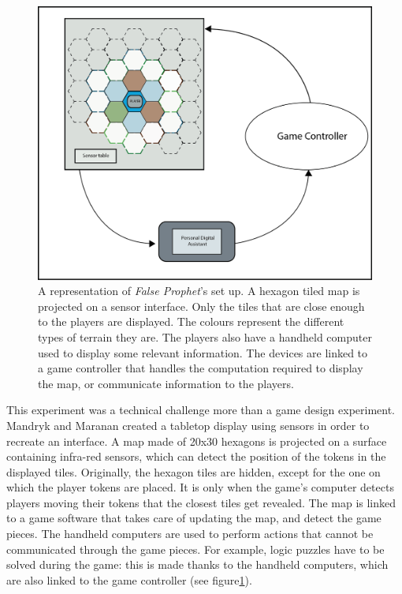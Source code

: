 \begin{figure}[h]
    \centering
    \includegraphics[scale=1]{Images/f_p_fig.png}
    \caption{A representation of \textit{False Prophet}'s set up. A hexagon tiled map is projected on a sensor interface. Only the tiles that are close enough to the players are displayed. The colours represent the different types of terrain they are. The players also have a handheld computer used to display some relevant information. The devices are linked to a game controller that handles the computation required to display the map, or communicate information to the players.}
    \label{fig:falseprophet}
\end{figure}

This experiment was a technical challenge more than a game design experiment. Mandryk and Maranan created a tabletop display using sensors in order to recreate an interface. A map made of 20x30 hexagons is projected on a surface containing infra-red sensors, which can detect the position of the tokens in the displayed tiles. Originally, the hexagon tiles are hidden, except for the one on which the player tokens are placed. It is only when the game's computer detects players moving their tokens that the closest tiles get revealed. The map is linked to a game software that takes care of updating the map, and detect the game pieces. The handheld computers are used to perform actions that cannot be communicated through the game pieces. For example, logic puzzles have to be solved during the game: this is made thanks to the handheld computers, which are also linked to the game controller (see figure\ref{fig:falseprophet}). 

